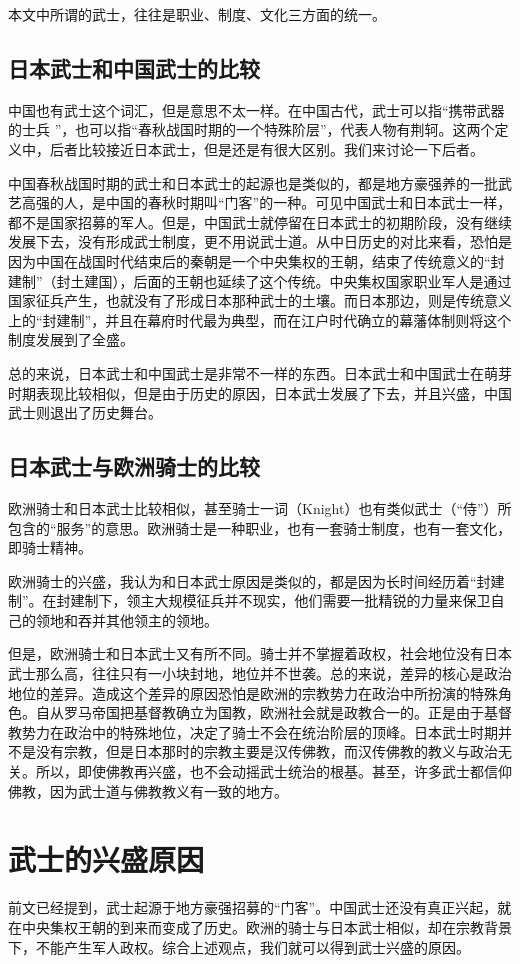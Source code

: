 \documentclass[utf8,a4paper]{ctexart}
\begin{document}
本文中所谓的武士，往往是职业、制度、文化三方面的统一。
\subsection{日本武士和中国武士的比较}
中国也有武士这个词汇，但是意思不太一样。在中国古代，武士可以指“携带武器的士兵
”，也可以指“春秋战国时期的一个特殊阶层”，代表人物有荆轲\cite{wushi13}。这两个定义中，后者比较接近日本武士，但是还是有很大区别。我们来讨论一下后者。

中国春秋战国时期的武士和日本武士的起源也是类似的，都是地方豪强养的一批武艺高强的人，是中国的春秋时期叫“门客”的一种。可见中国武士和日本武士一样，都不是国家招募的军人。但是，中国武士就停留在日本武士的初期阶段，没有继续发展下去，没有形成武士制度，更不用说武士道。从中日历史的对比来看，恐怕是因为中国在战国时代结束后的秦朝是一个中央集权的王朝，结束了传统意义的“封建制”（封土建国），后面的王朝也延续了这个传统。中央集权国家职业军人是通过国家征兵产生，也就没有了形成日本那种武士的土壤。而日本那边，则是传统意义上的“封建制”，并且在幕府时代最为典型，而在江户时代确立的幕藩体制则将这个制度发展到了全盛\cite{shi91}。

总的来说，日本武士和中国武士是非常不一样的东西。日本武士和中国武士在萌芽时期表现比较相似，但是由于历史的原因，日本武士发展了下去，并且兴盛，中国武士则退出了历史舞台。
\subsection{日本武士与欧洲骑士的比较}
欧洲骑士和日本武士比较相似，甚至骑士一词（Knight）也有类似武士（“侍”）所包含的“服务”的意思\cite{knight13}。欧洲骑士是一种职业，也有一套骑士制度，也有一套文化，即骑士精神。

欧洲骑士的兴盛，我认为和日本武士原因是类似的，都是因为长时间经历着“封建制”。在封建制下，领主大规模征兵并不现实，他们需要一批精锐的力量来保卫自己的领地和吞并其他领主的领地。

但是，欧洲骑士和日本武士又有所不同。骑士并不掌握着政权，社会地位没有日本武士那么高，往往只有一小块封地，地位并不世袭\cite{edge88}。总的来说，差异的核心是政治地位的差异。造成这个差异的原因恐怕是欧洲的宗教势力在政治中所扮演的特殊角色。自从罗马帝国把基督教确立为国教，欧洲社会就是政教合一的。正是由于基督教势力在政治中的特殊地位，决定了骑士不会在统治阶层的顶峰。日本武士时期并不是没有宗教，但是日本那时的宗教主要是汉传佛教，而汉传佛教的教义与政治无关。所以，即使佛教再兴盛，也不会动摇武士统治的根基。甚至，许多武士都信仰佛教，因为武士道与佛教教义有一致的地方\cite{liu99}。

\section{武士的兴盛原因}
前文已经提到，武士起源于地方豪强招募的“门客”。中国武士还没有真正兴起，就在中央集权王朝的到来而变成了历史。欧洲的骑士与日本武士相似，却在宗教背景下，不能产生军人政权。综合上述观点，我们就可以得到武士兴盛的原因。
\end{document}
